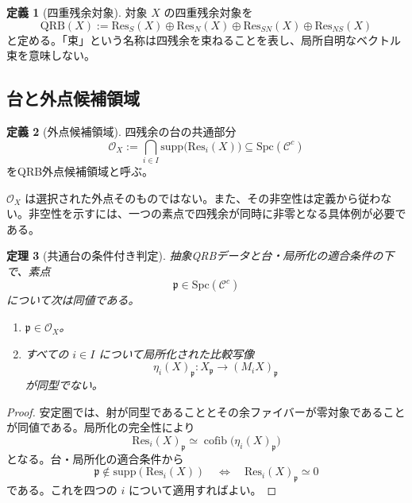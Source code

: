 \documentclass[a4paper,11pt]{ltjsarticle}
\theoremstyle{definition}
\newtheorem{definition}{定義}[section]
\theoremstyle{plain}
\newtheorem{theorem}[definition]{定理}
\newcommand{\QRB}{\mathrm{QRB}}
\newcommand{\Res}{\mathrm{Res}}
\newcommand{\cofib}{\operatorname{cofib}}
\newcommand{\supp}{\mathrm{supp}}
\newcommand{\Spc}{\mathrm{Spc}}
\begin{document}
\begin{definition}[四重残余対象]
対象 $X$ の四重残余対象を
\begin{equation}
 \QRB(X)
 :=
 \Res_S(X)\oplus
 \Res_N(X)\oplus
 \Res_{SN}(X)\oplus
 \Res_{NS}(X)
\end{equation}
と定める。「束」という名称は四残余を束ねることを表し、局所自明なベクトル束を意味しない。
\end{definition}

\subsection{台と外点候補領域}

\begin{definition}[外点候補領域]
四残余の台の共通部分
\begin{equation}
 \mathcal O_X
 :=
 \bigcap_{i\in I}
 \supp\bigl(\Res_i(X)\bigr)
 \subseteq\Spc(\mathcal C^c)
 \label{eq:qrb-locus}
\end{equation}
をQRB外点候補領域と呼ぶ\cite{balmer}。
\end{definition}

$\mathcal O_X$ は選択された外点そのものではない。また、その非空性は定義から従わない。非空性を示すには、一つの素点で四残余が同時に非零となる具体例が必要である。

\begin{theorem}[共通台の条件付き判定]
抽象QRBデータと台・局所化の適合条件の下で、素点
\begin{equation}
 \mathfrak p\in\Spc(\mathcal C^c)
\end{equation}
について次は同値である。
\begin{enumerate}
 \item $\mathfrak p\in\mathcal O_X$。
 \item すべての $i\in I$ について局所化された比較写像
 \begin{equation}
  \eta_i(X)_{\mathfrak p}:
  X_{\mathfrak p}\longrightarrow(M_iX)_{\mathfrak p}
 \end{equation}
 が同型でない。
\end{enumerate}
\end{theorem}

\begin{proof}
安定圏では、射が同型であることとその余ファイバーが零対象であることが同値である。局所化の完全性により
\begin{equation}
 \Res_i(X)_{\mathfrak p}
 \simeq
 \cofib\bigl(\eta_i(X)_{\mathfrak p}\bigr)
\end{equation}
となる。台・局所化の適合条件から
\begin{equation}
 \mathfrak p\notin\supp(\Res_i(X))
 \quad\Longleftrightarrow\quad
 \Res_i(X)_{\mathfrak p}\simeq0
\end{equation}
である。これを四つの $i$ について適用すればよい。
\end{proof}
\end{document}
